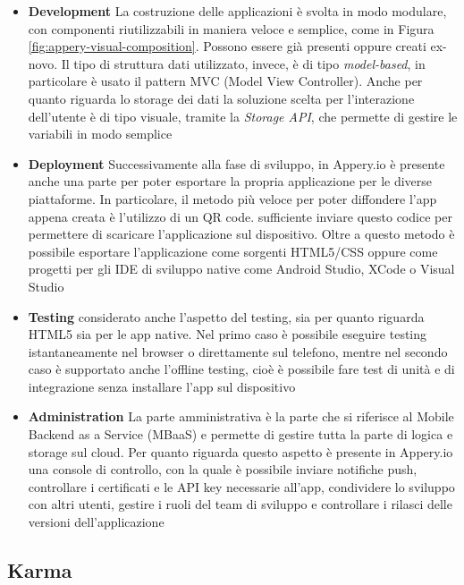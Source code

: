 \begin{itemize}
	\item \textbf{Development}
	La costruzione delle applicazioni è svolta in modo modulare, con componenti riutilizzabili in maniera veloce e semplice, come in Figura \ref{fig:appery-visual-composition}. Possono essere già presenti oppure creati ex-novo. Il tipo di struttura dati utilizzato, invece, è di tipo \emph{model-based}, in particolare è usato il pattern MVC (Model View Controller). Anche per quanto riguarda lo storage dei dati la soluzione scelta per l'interazione dell'utente è di tipo visuale, tramite la \emph{Storage API}, che permette di gestire le variabili in modo semplice
	\item \textbf{Deployment} Successivamente alla fase di sviluppo, in Appery.io è presente anche una parte per poter esportare la propria applicazione per le diverse piattaforme. In particolare, il metodo più veloce per poter diffondere l'app appena creata è l'utilizzo di un QR code. \upe sufficiente inviare questo codice per permettere di scaricare l'applicazione sul dispositivo. Oltre a questo metodo è possibile esportare l'applicazione come sorgenti HTML5/CSS oppure come progetti per gli IDE di sviluppo native come Android Studio, XCode o Visual Studio
	\item \textbf{Testing} \upe considerato anche l'aspetto del testing, sia per quanto riguarda HTML5 sia per  le app native.
	Nel primo caso è possibile eseguire testing istantaneamente nel browser o direttamente sul telefono, mentre nel secondo caso è supportato anche l'offline testing, cioè è possibile fare test di unità e di integrazione senza installare l'app sul dispositivo
	\item \textbf{Administration} La parte amministrativa è la parte che si riferisce al Mobile Backend as a Service (MBaaS) e permette di gestire tutta la parte di logica e storage sul cloud. Per quanto riguarda questo aspetto è presente in Appery.io una console di controllo, con la quale è possibile inviare notifiche push, controllare i certificati e le API key necessarie all'app, condividere lo sviluppo con altri utenti, gestire i ruoli del team di sviluppo e controllare i rilasci delle versioni dell'applicazione
\end{itemize}

\subsection*{Karma}

